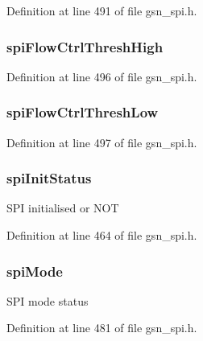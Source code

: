 Definition at line 491 of file gsn\_\-spi.h.

\hypertarget{a00230_a7a439375ec71a8ebe796fcf8730e7b25}{
\subsubsection[{spiFlowCtrlThreshHigh}]{ {\bf spiFlowCtrlThreshHigh}}}
\label{a00230_a7a439375ec71a8ebe796fcf8730e7b25}


Definition at line 496 of file gsn\_\-spi.h.

\hypertarget{a00230_ab3786a410bf7727e7b2a8fc665b8166e}{
\subsubsection[{spiFlowCtrlThreshLow}]{ {\bf spiFlowCtrlThreshLow}}}
\label{a00230_ab3786a410bf7727e7b2a8fc665b8166e}


Definition at line 497 of file gsn\_\-spi.h.

\hypertarget{a00230_a37e30f5b408d31bdf077d448268cee43}{
\subsubsection[{spiInitStatus}]{ {\bf spiInitStatus}}}
\label{a00230_a37e30f5b408d31bdf077d448268cee43}
SPI initialised or NOT 

Definition at line 464 of file gsn\_\-spi.h.

\hypertarget{a00230_ab1f5bd9a03dacfe8a653d9cc61bcf820}{
\subsubsection[{spiMode}]{ {\bf spiMode}}}
\label{a00230_ab1f5bd9a03dacfe8a653d9cc61bcf820}
SPI mode status 

Definition at line 481 of file gsn\_\-spi.h.

